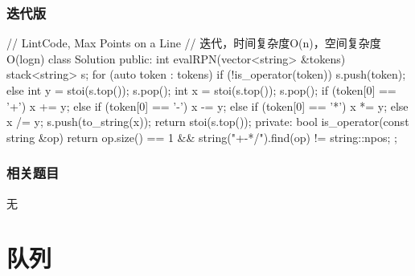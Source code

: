 \subsubsection{迭代版}
\begin{Code}
// LintCode, Max Points on a Line
// 迭代，时间复杂度O(n)，空间复杂度O(logn)
class Solution {
public:
    int evalRPN(vector<string> &tokens) {
        stack<string> s;
        for (auto token : tokens) {
            if (!is_operator(token)) {
                s.push(token);
            } else {
                int y = stoi(s.top());
                s.pop();
                int x = stoi(s.top());
                s.pop();
                if (token[0] == '+')       x += y;
                else if (token[0] == '-')  x -= y;
                else if (token[0] == '*')  x *= y;
                else                       x /= y;
                s.push(to_string(x));
            }
        }
        return stoi(s.top());
    }
private:
    bool is_operator(const string &op) {
        return op.size() == 1 && string("+-*/").find(op) != string::npos;
    }
};
\end{Code}


\subsubsection{相关题目}
\begindot
\item 无
\myenddot


\section{队列} %

